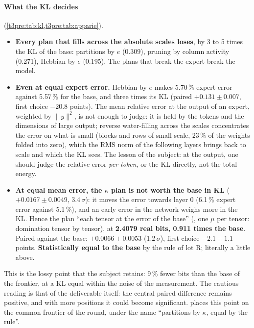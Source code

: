 \paragraph{What the KL decides} (\cref{t3pre:tab:kl,t3pre:tab:apparie}).
\begin{itemize}
\item \textbf{Every plan that fills across the absolute scales loses}, by 3 to 5 times the KL of the base: partitions by $e$ (0.309), pruning by column activity (0.271), Hebbian by $e$ (0.195). The plans that break the expert break the model.
\item \textbf{Even at equal expert error.} Hebbian by $e$ makes 5.70\,\% expert error against 5.57\,\% for the base, and three times its KL (paired $+0.131 \pm 0.007$, first choice $-20.8$ points). The mean relative error at the output of an expert, weighted by $\|y\|^2$, is not enough to judge: it is held by the tokens and the dimensions of large output; reverse water-filling across the scales concentrates the error on what is small (blocks and rows of small scale, 23\,\% of the weights folded into zero), which the RMS norm of the following layers brings back to scale and which the KL sees. The lesson of the subject: at the output, one should judge the relative error \emph{per token}, or the KL directly, not the total energy.
\item \textbf{At equal mean error, the $\kappa$ plan is not worth the base in KL} ($+0.0167 \pm 0.0049$, 3.4\,$\sigma$): it moves the error towards layer 0 (6.1\,\% expert error against 5.1\,\%), and an early error in the network weighs more in the KL. Hence the plan ``each tensor at the error of the base'' (, one $\mu$ per tensor: domination tensor by tensor), at \textbf{2.4079 real bits, 0.911 times the base}. Paired against the base: $+0.0066 \pm 0.0053$ (1.2\,$\sigma$), first choice $-2.1 \pm 1.1$ points. \textbf{Statistically equal to the base} by the rule of lot R; literally a little above.
\end{itemize}

This is the lossy point that the subject retains: 9\,\% fewer bits than the base of the frontier, at a KL equal within the noise of the measurement. The cautious reading is that of the deliverable itself: the central paired difference remains positive, and with more positions it could become significant.  places this point on the common frontier of the round, under the name ``partitions by $\kappa$, equal by the rule''.

